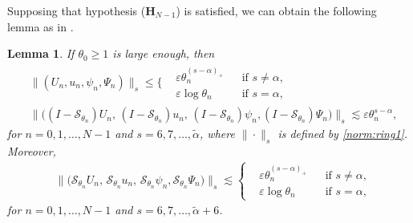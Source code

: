 \documentclass[twoside,11pt]{article}
\numberwithin{equation}{section}
\newtheorem{lemma}{Lemma}[section]
\begin{document}
Supposing that hypothesis ($\mathbf{H}_{{N}-1}$) is satisfied,
we can obtain the following lemma as in \cite{CS08MR2423311,T09ARMAMR2481071,TW21MR4201624,TW22aMR4444136,TW22cMR4506578}.
\begin{lemma}
	\label{lem:triangle}
	If $\theta_0\geq 1$ is large enough, then
	\begin{align}
		& \| ( U_{n}, u_{n}, \psi_{n},\Psi_{n})\|_{s}
		\leq \bigg\{\begin{aligned}
			&\varepsilon \theta_{n}^{(s-{\alpha })_+}   &&\textrm{if }s\neq {\alpha },\\
			&\varepsilon \log \theta_{n}   &&\textrm{if }s= {\alpha },
		\end{aligned}
		\nonumber  %
		\\[1mm]
		& \big\|\big(({I}-\mathcal{S}_{\theta_{n}})U_{n},\, ({I}-\mathcal{S}_{\theta_{n}})u_{n} ,\, ({I}-\mathcal{S}_{\theta_{n}})\psi_{n}, ({I}-\mathcal{S}_{\theta_{n}})\Psi_{n} \big)\big\|_{s}
		\lesssim \varepsilon \theta_{n}^{s-{\alpha }},
		\nonumber %
	\end{align}
	for ${n}=0,1,\ldots,{N}-1$ and  $s=6,7,\ldots,\widetilde{\alpha}$,
	where $\|\cdot \|_{s}$ is defined by \eqref{norm:ring1}. Moreover,
	\begin{align}
		&
		\big\|\big(\mathcal{S}_{\theta_{n}}U_{n} ,\, \mathcal{S}_{\theta_{n}}u_{n} ,\,\mathcal{S}_{\theta_{n}}\psi_{n}, \mathcal{S}_{\theta_{n}}\Psi_{n} \big)\big\|_{s}
		\lesssim  \left\{\begin{aligned}
			&\varepsilon \theta_{n}^{(s-{\alpha })_+}  &&\textrm{if }s\neq {\alpha },\\
			&\varepsilon \log \theta_{n}  &&\textrm{if }s= {\alpha },
		\end{aligned}\right.  \nonumber  %
	\end{align}
	for ${n}=0,1,\ldots,{N}-1$ and $s=6,7,\ldots,\widetilde{\alpha}+6$.
\end{lemma}
\end{document}

